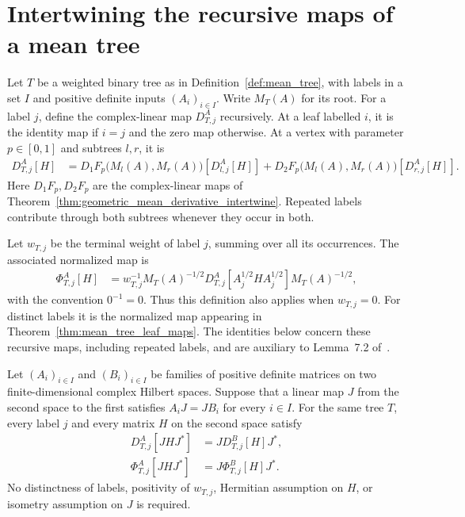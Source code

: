 \section{Intertwining the recursive maps of a mean tree}
\label{sec:mean_tree_derivative_intertwine}

Let $T$ be a weighted binary tree as in Definition~\ref{def:mean_tree},
with labels in a set $I$ and positive definite inputs $(A_i)_{i\in I}$.
Write $M_T(A)$ for its root. For a label $j$, define the complex-linear
map $D_{T,j}^A$ recursively. At a leaf labelled $i$, it is the identity
map if $i=j$ and the zero map otherwise. At a vertex with parameter
$p\in[0,1]$ and subtrees $l,r$, it is
\begin{align}
  D_{T,j}^A[H]
    &=D_1F_p\bigl(M_l(A),M_r(A)\bigr)[D_{l,j}^A[H]]
      +D_2F_p\bigl(M_l(A),M_r(A)\bigr)[D_{r,j}^A[H]].
\end{align}
Here $D_1F_p,D_2F_p$ are the complex-linear maps of
Theorem~\ref{thm:geometric_mean_derivative_intertwine}.
Repeated labels contribute through both subtrees whenever they occur in both.

Let $w_{T,j}$ be the terminal weight of label $j$, summing over all its
occurrences. The associated normalized map is
\begin{align}
  \Phi_{T,j}^A[H]
    &=w_{T,j}^{-1}M_T(A)^{-1/2}
      D_{T,j}^A[A_j^{1/2}HA_j^{1/2}]M_T(A)^{-1/2},
\end{align}
with the convention $0^{-1}=0$. Thus this definition also applies when
$w_{T,j}=0$. For distinct labels it is the normalized map appearing in
Theorem~\ref{thm:mean_tree_leaf_maps}. The identities below concern these
recursive maps, including repeated labels, and are auxiliary to
Lemma~7.2 of~\cite{OpenAI2026AreaLaw}.

\begin{theorem}
  \label{thm:mean_tree_derivative_intertwine}
  \leanok
  Let $(A_i)_{i\in I}$ and $(B_i)_{i\in I}$ be families of positive definite
  matrices on two finite-dimensional complex Hilbert spaces.
  Suppose that a linear map $J$ from the second space to the first satisfies
  $A_iJ=JB_i$ for every $i\in I$. For the same tree $T$, every label $j$
  and every matrix $H$ on the second space satisfy
  \begin{align}
    D_{T,j}^A[JHJ^*]&=J D_{T,j}^B[H]J^*, \\
    \Phi_{T,j}^A[JHJ^*]&=J\Phi_{T,j}^B[H]J^*.
  \end{align}
  No distinctness of labels, positivity of $w_{T,j}$, Hermitian assumption
  on $H$, or isometry assumption on $J$ is required.
\end{theorem}

